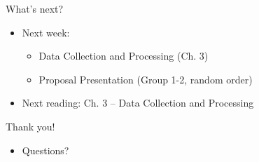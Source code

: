 \documentclass [xcolor=svgnames, handout]{beamer}
\begin{document}
\begin{frame}{What's next?}
    \begin{itemize}[<+->]
        \item Next week: 
        \begin{itemize}[<+->]
            \item Data Collection and Processing (Ch. 3)
            \item Proposal Presentation (Group 1-2, random order)
        \end{itemize}
        \item Next reading: Ch. 3 -- Data Collection and Processing
    \end{itemize}
\end{frame}

\begin{frame}{Thank you!}
    \begin{itemize}[<+->]
        \item Questions?
    \end{itemize}
\end{frame}
\end{document}
